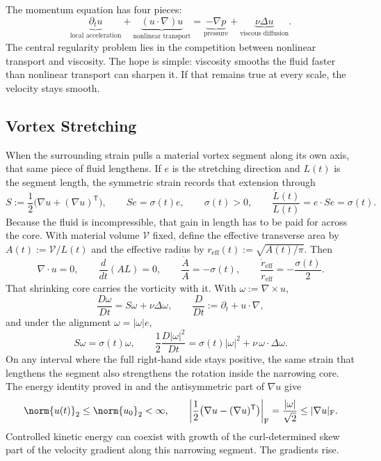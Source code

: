 
The momentum equation has four pieces:
\[
  \underbrace{\partial_t u}_{\text{local acceleration}}
  +
  \underbrace{(u\cdot\nabla)u}_{\text{nonlinear transport}}
  =
  \underbrace{-\nabla p}_{\text{pressure}}
  +
  \underbrace{\nu\Delta u}_{\text{viscous diffusion}}.
\]
The central regularity problem lies in the competition between nonlinear transport and viscosity.
The hope is simple: viscosity smooths the fluid faster than nonlinear transport can sharpen it.
If that remains true at every scale, the velocity stays smooth.

\subsection{Vortex Stretching}\label{sub:ThePerfectlyStretchingVortex}

When the surrounding strain pulls a material vortex segment along its own axis, that same piece of fluid lengthens. If \(e\) is the stretching direction and \(L(t)\) is the segment length, the symmetric strain records that extension through
\[
  S:=\frac12\bigl(\nabla u+(\nabla u)^{\mathsf T}\bigr),
  \qquad
  Se=\sigma(t)e,
  \qquad
  \sigma(t)>0,
  \qquad
  \frac{\dot L(t)}{L(t)}
  =
  e\cdot Se
  =
  \sigma(t).
\]
Because the fluid is incompressible, that gain in length has to be paid for across the core. With material volume \(\mathcal V\) fixed, define the effective transverse area by \(A(t):=\mathcal V/L(t)\) and the effective radius by \(r_{\mathrm{eff}}(t):=\sqrt{A(t)/\pi}\). Then
\[
  \nabla\cdot u=0,
  \qquad
  \frac{d}{dt}(A L)=0,
  \qquad
  \frac{\dot A}{A}=-\sigma(t),
  \qquad
  \frac{\dot r_{\mathrm{eff}}}{r_{\mathrm{eff}}}
  =
  -\frac{\sigma(t)}{2}.
\]
That shrinking core carries the vorticity with it. With \(\omega:=\nabla\times u\),
\[
  \frac{D\omega}{Dt}
  =
  S\omega+\nu\Delta\omega,
  \qquad
  \frac{D}{Dt}
  :=
  \partial_t+u\cdot\nabla,
\]
and under the alignment \(\omega=|\omega|e\),
\[
  S\omega
  =
  \sigma(t)\omega,
  \qquad
  \frac12\frac{D|\omega|^2}{Dt}
  =
  \sigma(t)|\omega|^2
  +
  \nu\,\omega\cdot\Delta\omega.
\]
On any interval where the full right-hand side stays positive, the same strain that lengthens the segment also strengthens the rotation inside the narrowing core. The energy identity proved in  and the antisymmetric part of \(\nabla u\) give
\[
  \norm{u(t)}_2
  \leq
  \norm{u_0}_2
  <\infty,
  \qquad
  \left|\frac12\bigl(\nabla u-(\nabla u)^{\mathsf T}\bigr)\right|_{\mathrm F}
  =
  \frac{|\omega|}{\sqrt2}
  \leq
  |\nabla u|_{\mathrm F}.
\]
Controlled kinetic energy can coexist with growth of the curl-determined skew part of the velocity gradient along this narrowing segment. The gradients rise.

